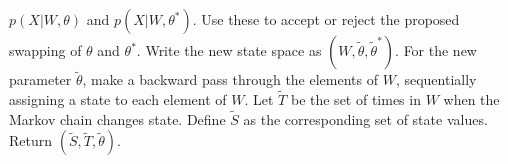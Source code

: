 \begin{algorithm}[H]
\begin{algorithmic}[1]
    $p(X|W,\theta)$ and $p(X|W,\theta^*)$. Use these to accept or reject the
    proposed swapping of $\theta$ and $\theta^*$. Write the new state space
    as $(W,\tilde{\theta},\tilde{\theta}^*)$.
    \State For the new parameter $\tilde{\theta}$, make a backward pass through 
    the elements of
    $W$, sequentially assigning a state to each element of $W$.
    \State Let $\tilde{T}$ be the set of times in $W$ when the Markov chain changes state. Define $\tilde{S}$ as the corresponding set of state values. Return $(\tilde{S}, \tilde{T}, \tilde{\theta})$.
\end{algorithmic}
\end{algorithm}
